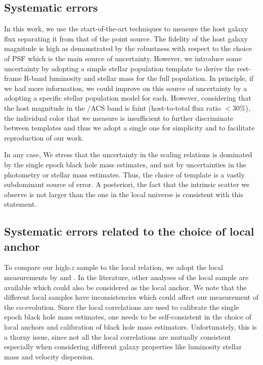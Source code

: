 \documentclass[apj]{emulateapj}
\begin{document}
\subsection{Systematic errors}

In this work, we use the start-of-the-art techniques to measure the host galaxy flux separating it from that of the point source. The fidelity of the host galaxy magnitude is high as demonstrated by the robustness with respect to the choice of PSF which is the main source of uncertainty. However, we introduce some uncertainty by adopting a simple stellar population template to derive the rest-frame R-band luminosity and stellar mass for the full population. In principle, if we had more information, we could improve on this source of uncertainty by a adopting a specific stellar population model for each. However, considering that the host magnitude in the \hst/ACS band is faint (host-to-total flux ratio $< 30\%$), the individual color that we measure is insufficient to further discriminate between templates and thus we adopt a single one for simplicity and to facilitate reproduction of our work.


In any case, We stress that the uncertainty in the scaling relations is dominated by the single epoch black hole mass estimates, and not by uncertainties in the photometry or stellar mass estimates. Thus, the choice of template is a vastly subdominant source of error. A posteriori, the fact that the intrinsic scatter we observe is not larger than the one in the local universe is consistent with this statement.

\subsection{Systematic errors related to the choice of local anchor}
\label{sec:local_sys}

To compare our high-$z$ sample to the local relation, we adopt the local measurements by \citet{Ben++10, Bennert++2011} and  \citet{H+R04}. In the literature, other analyses of the local sample are available which could also be considered as the local anchor. We note that the different local samples have inconsistencies which could affect our measurement of the co-evolution. Since the local correlations are used to calibrate the single epoch black hole mass estimates, one needs to be self-consistent in the choice of local anchors and calibration of black hole mass estimators. Unfortunately, this is a thorny issue, since not all the local correlations are mutually consistent especially when considering different galaxy properties like luminosity stellar mass and velocity dispersion.
\end{document}
